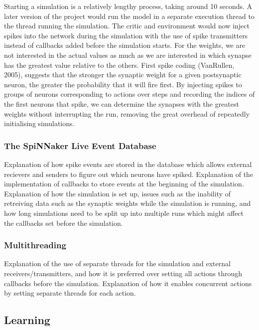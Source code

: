 \documentclass[10pt]{article}
\begin{document}
    Starting a simulation is a relatively lengthy process, taking around 10 seconds. A later version of the project would run the model in a separate execution thread to the thread running the simulation. The critic and environment would now inject spikes into the network during the simulation with the use of spike transmitters instead of callbacks added before the simulation starts. For the weights, we are not interested in the actual values as much as we are interested in which synapse has the greatest value relative to the others. First spike coding (VanRullen, 2005), suggests that the stronger the synaptic weight for a given postsynaptic neuron, the greater the probability that it will fire first. By injecting spikes to groups of neurons corresponding to actions over steps and recording the indices of the first neurons that spike, we can determine the synapses with the greatest weights without interrupting the run, removing the great overhead of repeatedly initialising simulations.

    \subsubsection{The SpiNNaker Live Event Database}

    Explanation of how spike events are stored in the database which allows external recievers and senders to figure out which neurons have spiked. Explanation of the implementation of callbacks to store events at the beginning of the simulation. Explanation of how the simulation is set up, issues such as the inability of retreiving data such as the synaptic weights while the simulation is running, and how long simulations need to be split up into multiple runs which might affect the callbacks set before the simulation.

    \subsubsection{Multithreading}

    Explanation of the use of separate threads for the simulation and external receivers/transmitters, and how it is preferred over setting all actions through callbacks before the simulation. Explanation of how it enables concurrent actions by setting separate threads for each action.

    \subsection{Learning}
\end{document}

